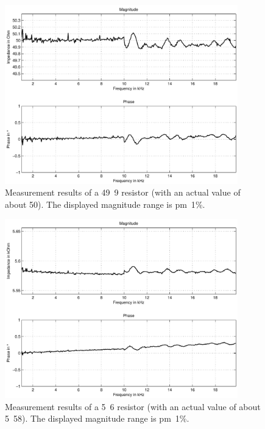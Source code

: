 \begin{figure}[htpb]
  \centering
    \includegraphics[width=0.9\textwidth]{bilder/meas_49r9.pdf}
  \caption{Measurement results of a \unit{49.9}{\ohm} resistor (with an actual value of about \unit{50}{\ohm}).
    The displayed magnitude range is \unit{\pm 1}{\%}.}
  \label{fig:meas_49r9}
\end{figure}

\begin{figure}[htpb]
  \centering
    \includegraphics[width=0.9\textwidth]{bilder/meas_5k6.pdf}
  \caption{Measurement results of a \unit{5.6}{\kilo\ohm} resistor (with an actual value of about \unit{5.58}{\kilo\ohm}).
    The displayed magnitude range is \unit{\pm 1}{\%}.}
  \label{fig:meas_5k6}
\end{figure}

